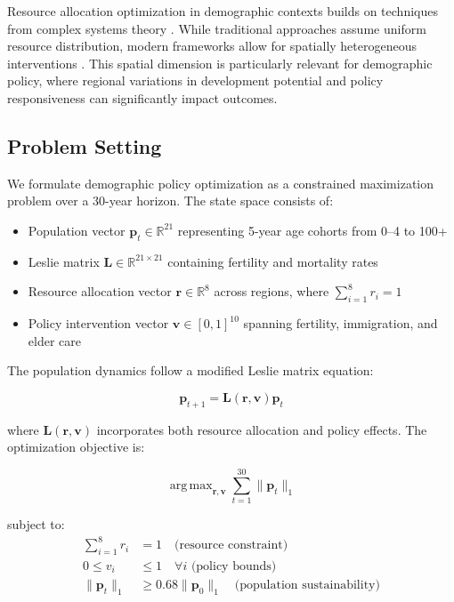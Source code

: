\documentclass{article} %
\DeclareMathOperator*{\argmax}{arg\,max}
\begin{document}
Resource allocation optimization in demographic contexts builds on techniques from complex systems theory \citep{vae, gan}. While traditional approaches assume uniform resource distribution, modern frameworks allow for spatially heterogeneous interventions \citep{yang2023diffusion}. This spatial dimension is particularly relevant for demographic policy, where regional variations in development potential and policy responsiveness can significantly impact outcomes.

\subsection{Problem Setting}
\label{subsec:problem}

We formulate demographic policy optimization as a constrained maximization problem over a 30-year horizon. The state space consists of:

\begin{itemize}
    \item Population vector $\mathbf{p}_t \in \mathbb{R}^{21}$ representing 5-year age cohorts from 0--4 to 100+
    \item Leslie matrix $\mathbf{L} \in \mathbb{R}^{21 \times 21}$ containing fertility and mortality rates
    \item Resource allocation vector $\mathbf{r} \in \mathbb{R}^8$ across regions, where $\sum_{i=1}^8 r_i = 1$
    \item Policy intervention vector $\mathbf{v} \in {[0,1]}^{10}$ spanning fertility, immigration, and elder care
\end{itemize}

The population dynamics follow a modified Leslie matrix equation:

\begin{equation}
    \mathbf{p}_{t+1} = \mathbf{L}(\mathbf{r}, \mathbf{v}) \mathbf{p}_t
\end{equation}

where $\mathbf{L}(\mathbf{r}, \mathbf{v})$ incorporates both resource allocation and policy effects. The optimization objective is:

\begin{equation}
    \argmax_{\mathbf{r}, \mathbf{v}} \sum_{t=1}^{30} \|\mathbf{p}_t\|_1
\end{equation}

subject to:
\begin{align*}
    \sum_{i=1}^8 r_i &= 1 \quad \text{(resource constraint)} \\
    0 \leq v_i &\leq 1 \quad \forall i \text{ (policy bounds)} \\
    \|\mathbf{p}_t\|_1 &\geq 0.68\|\mathbf{p}_0\|_1 \quad \text{(population sustainability)}
\end{align*}
\end{document}
